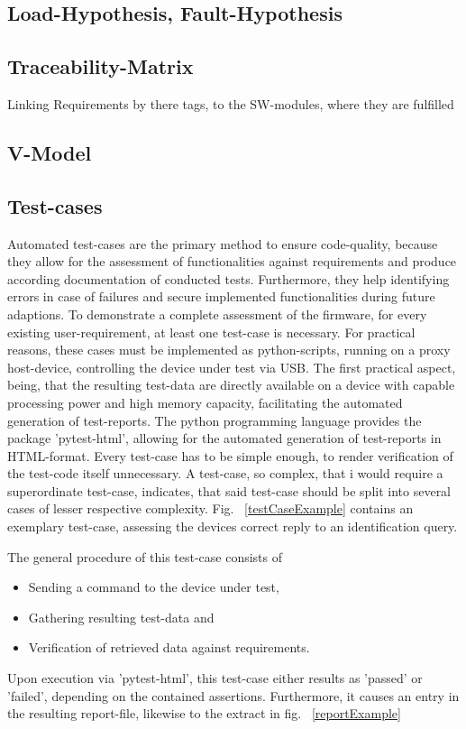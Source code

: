 \documentclass[master,english,smartquotes,apa]{hgbthesis}
\begin{document}
			\subsection{Load-Hypothesis, Fault-Hypothesis}
			\subsection{Traceability-Matrix}
			Linking Requirements by there tags, to the SW-modules, where they are fulfilled
			\subsection{V-Model}
			\subsection{Test-cases}
			Automated test-cases are the primary method to ensure code-quality, because they allow for the assessment of functionalities against requirements and produce according documentation of conducted tests. Furthermore, they help identifying  errors in case of failures and secure implemented functionalities during future adaptions. To demonstrate a complete assessment of the firmware, for every existing user-requirement, at least one test-case is necessary. For practical reasons, these cases must be implemented as python-scripts, running on a proxy host-device, controlling the device under test via USB. The first practical aspect, being, that the resulting test-data are directly available on a device with capable processing power and high memory capacity, facilitating the automated generation of test-reports. The python programming language provides the package 'pytest-html', allowing for the automated generation of test-reports in HTML-format. Every test-case has to be simple enough, to render verification of the test-code itself unnecessary. A test-case, so complex, that i would require a superordinate test-case, indicates, that said test-case should be split into several cases of lesser respective complexity. Fig. ~\ref{testCaseExample} contains an exemplary test-case, assessing the devices correct reply to an identification query. 
			
			The general procedure of this test-case consists of 
			\begin{itemize} \setlength\itemsep{1px}
			\item Sending a command to the device under test,
			\item Gathering resulting test-data and
			\item Verification of retrieved data against requirements.
			\end{itemize}
			Upon execution via 'pytest-html', this test-case either results as 'passed' or 'failed', depending on the contained assertions. Furthermore, it causes an entry in the resulting report-file, likewise to the extract in fig. ~\ref{reportExample}
			
\end{document}
